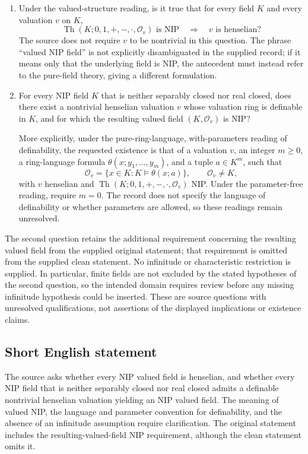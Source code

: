\documentclass[11pt]{article}
\begin{document}
\begin{enumerate}
\item Under the valued-structure reading, is it true that for every field \(K\) and every valuation \(v\) on \(K\),
\[
\operatorname{Th}(K;0,1,+,-,\cdot,\mathcal O_v)\text{ is NIP}
\quad\Longrightarrow\quad v\text{ is henselian}?
\]
The source does not require \(v\) to be nontrivial in this question. The phrase ``valued NIP field'' is not explicitly disambiguated in the supplied record; if it means only that the underlying field is NIP, the antecedent must instead refer to the pure-field theory, giving a different formulation.
\item For every NIP field \(K\) that is neither separably closed nor real closed, does there exist a nontrivial henselian valuation \(v\) whose valuation ring is definable in \(K\), and for which the resulting valued field \((K,\mathcal O_v)\) is NIP?

More explicitly, under the pure-ring-language, with-parameters reading of definability, the requested existence is that of a valuation \(v\), an integer \(m\geq0\), a ring-language formula \(\theta(x;y_1,\ldots,y_m)\), and a tuple \(a\in K^m\), such that
\[
\mathcal O_v=\{x\in K:K\models\theta(x;a)\},\qquad
\mathcal O_v\ne K,
\]
with \(v\) henselian and \(\operatorname{Th}(K;0,1,+,-,\cdot,\mathcal O_v)\) NIP. Under the parameter-free reading, require \(m=0\). The record does not specify the language of definability or whether parameters are allowed, so these readings remain unresolved.
\end{enumerate}

The second question retains the additional requirement concerning the resulting valued field from the supplied original statement; that requirement is omitted from the supplied clean statement. No infinitude or characteristic restriction is supplied. In particular, finite fields are not excluded by the stated hypotheses of the second question, so the intended domain requires review before any missing infinitude hypothesis could be inserted. These are source questions with unresolved qualifications, not assertions of the displayed implications or existence claims.
\subsection{Short English statement}
The source asks whether every NIP valued field is henselian, and whether every NIP field that is neither separably closed nor real closed admits a definable nontrivial henselian valuation yielding an NIP valued field. The meaning of valued NIP, the language and parameter convention for definability, and the absence of an infinitude assumption require clarification. The original statement includes the resulting-valued-field NIP requirement, although the clean statement omits it.
\end{document}
